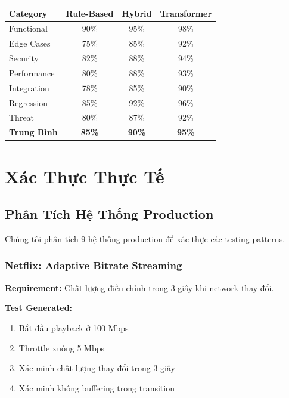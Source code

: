 \documentclass[12pt,oneside]{report}
\begin{document}
\begin{table}[H]
\centering
\begin{tabular}{|l|c|c|c|}
\hline
\textbf{Category} & \textbf{Rule-Based} & \textbf{Hybrid} & \textbf{Transformer} \\
\hline
Functional & 90\% & 95\% & 98\% \\
Edge Cases & 75\% & 85\% & 92\% \\
Security & 82\% & 88\% & 94\% \\
Performance & 80\% & 88\% & 93\% \\
Integration & 78\% & 85\% & 90\% \\
Regression & 85\% & 92\% & 96\% \\
Threat & 80\% & 87\% & 92\% \\
\hline
\textbf{Trung Bình} & \textbf{85\%} & \textbf{90\%} & \textbf{95\%} \\
\hline
\end{tabular}
\end{table}


\chapter{Xác Thực Thực Tế}

\section{Phân Tích Hệ Thống Production}

Chúng tôi phân tích 9 hệ thống production để xác thực các testing patterns.

\subsection{Netflix: Adaptive Bitrate Streaming}

\textbf{Requirement:} Chất lượng điều chỉnh trong 3 giây khi network thay đổi.

\textbf{Test Generated:}
\begin{enumerate}
    \item Bắt đầu playback ở 100 Mbps
    \item Throttle xuống 5 Mbps
    \item Xác minh chất lượng thay đổi trong 3 giây
    \item Xác minh không buffering trong transition
\end{enumerate}
\end{document}
